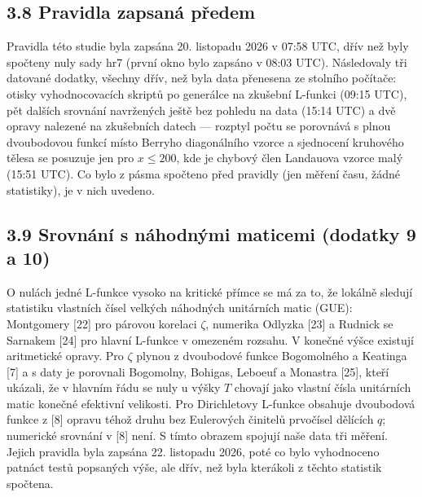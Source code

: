 \documentclass[
  10pt,
]{article}
\begin{document}
\hypertarget{pravidla-zapsanuxe1-pux159edem}{%
\subsection{3.8 Pravidla zapsaná
předem}\label{pravidla-zapsanuxe1-pux159edem}}

Pravidla této studie byla zapsána 20. listopadu 2026 v 07:58 UTC, dřív
než byly spočteny nuly sady hr7 (první okno bylo zapsáno v 08:03 UTC).
Následovaly tři datované dodatky, všechny dřív, než byla data přenesena
ze stolního počítače: otisky vyhodnocovacích skriptů po generálce na
zkušební L-funkci (09:15 UTC), pět dalších srovnání navržených ještě bez
pohledu na data (15:14 UTC) a dvě opravy nalezené na zkušebních datech
--- rozptyl počtu se porovnává s plnou dvoubodovou funkcí místo Berryho
diagonálního vzorce a sjednocení kruhového tělesa se posuzuje jen pro
\(x \le 200\), kde je chybový člen Landauova vzorce malý (15:51 UTC). Co
bylo z pásma spočteno před pravidly (jen měření času, žádné statistiky),
je v nich uvedeno.

\hypertarget{srovnuxe1nuxed-s-nuxe1hodnuxfdmi-maticemi-dodatky-9-a-10}{%
\subsection{3.9 Srovnání s náhodnými maticemi (dodatky 9 a
10)}\label{srovnuxe1nuxed-s-nuxe1hodnuxfdmi-maticemi-dodatky-9-a-10}}

O nulách jedné L-funkce vysoko na kritické přímce se má za to, že
lokálně sledují statistiku vlastních čísel velkých náhodných unitárních
matic (GUE): Montgomery {[}22{]} pro párovou korelaci \(\zeta\),
numerika Odlyzka {[}23{]} a Rudnick se Sarnakem {[}24{]} pro hlavní
L-funkce v omezeném rozsahu. V konečné výšce existují aritmetické
opravy. Pro \(\zeta\) plynou z dvoubodové funkce Bogomolného a Keatinga
{[}7{]} a s daty je porovnali Bogomolny, Bohigas, Leboeuf a Monastra
{[}25{]}, kteří ukázali, že v hlavním řádu se nuly u výšky \(T\) chovají
jako vlastní čísla unitárních matic konečné efektivní velikosti. Pro
Dirichletovy L-funkce obsahuje dvoubodová funkce z {[}8{]} opravu téhož
druhu bez Eulerových činitelů prvočísel dělících \(q\); numerické
srovnání v {[}8{]} není. S tímto obrazem spojují naše data tři měření.
Jejich pravidla byla zapsána 22. listopadu 2026, poté co bylo
vyhodnoceno patnáct testů popsaných výše, ale dřív, než byla kterákoli z
těchto statistik spočtena.
\end{document}
